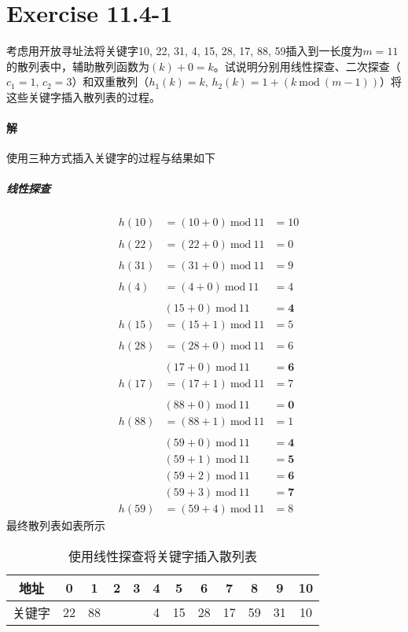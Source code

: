\documentclass{article}
\begin{document}
\section{Exercise 11.4-1}
考虑用开放寻址法将关键字10, 22, 31, 4, 15, 28, 17, 88, 59插入到一长度为$m = 11$的散列表中，辅助散列函数为$(k) + 0 = k$。试说明分别用线性探查、二次探查（$c_1 = 1,\,c_2 = 3$）和双重散列（$h_1(k) = k,\,
h_2(k) = 1 + (k\ \text{mod}\ (m − 1))$）将这些关键字插入散列表的过程。

\paragraph{解}
使用三种方式插入关键字的过程与结果如下
\subparagraph{线性探查}
\begin{align*}
    &h(10) &= (10 + 0) \ \text{mod}\  11 &= 10 \\
    \\
    &h(22) &= (22 + 0) \ \text{mod}\  11 &= 0 \\
    \\
    &h(31) &= (31 + 0) \ \text{mod}\  11 &= 9 \\
    \\
    &h(4) &= (4 + 0) \ \text{mod}\  11 &= 4 \\
    \\
    && (15 + 0) \ \text{mod}\  11 &= \mathbf{4} \\
    &h(15) &= (15 + 1) \ \text{mod}\  11 &= 5 \\
    \\
    &h(28) &= (28 + 0) \ \text{mod}\  11 &= 6 \\
    \\
    &&(17 + 0) \ \text{mod}\  11 &= \mathbf{6} \\
    &h(17) &= (17 + 1) \ \text{mod}\  11 &= 7 \\
    \\
    &&(88 + 0) \ \text{mod}\  11 &= \mathbf{0} \\
    &h(88) &= (88 + 1) \ \text{mod}\  11 &= 1 \\
    \\
    &&(59 + 0) \ \text{mod}\  11 &= \mathbf{4} \\
    &&(59 + 1) \ \text{mod}\  11 &= \mathbf{5} \\
    &&(59 + 2) \ \text{mod}\  11 &= \mathbf{6} \\
    &&(59 + 3) \ \text{mod}\  11 &= \mathbf{7} \\
    &h(59) &= (59 + 4) \ \text{mod}\  11 &= 8
\end{align*}
最终散列表如表所示
\begin{table}[H]
    \centering
    \begin{tabular}{|c|c|c|c|c|c|c|c|c|c|c|c|}
    \hline
    地址 & 0 & 1 & 2 & 3 & 4 & 5 & 6 & 7 & 8 & 9 & 10 \\ \hline
    关键字 & 22 & 88 &  &  & 4 & 15 & 28 & 17 & 59 & 31 & 10 \\ \hline
    \end{tabular}
    \caption{使用线性探查将关键字插入散列表}
\end{table}
\end{document}
